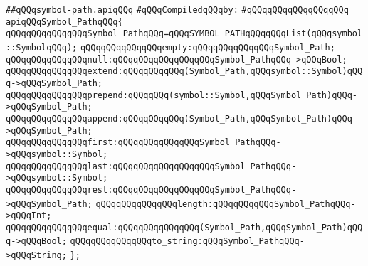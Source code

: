 \label{src/lib/compiler/front/typer-stuff/basics/symbol-path.api}
\verb|##qQQqsymbol-path.apiqQQq|\newline
\newline
\verb|#qQQqCompiledqQQqby:|\newline
\verb|#qQQqqQQqqQQqqQQqqQQq|\newline
\newline
\newline
\newline
\verb|apiqQQqSymbol_PathqQQq{|\newline
\newline
\verb|qQQqqQQqqQQqqQQqSymbol_PathqQQq=qQQqSYMBOL_PATHqQQqqQQqList(qQQqsymbol::SymbolqQQq);|\newline
\newline
\verb|qQQqqQQqqQQqqQQqempty:qQQqqQQqqQQqqQQqSymbol_Path;|\newline
\verb|qQQqqQQqqQQqqQQqnull:qQQqqQQqqQQqqQQqqQQqSymbol_PathqQQq->qQQqBool;|\newline
\verb|qQQqqQQqqQQqqQQqextend:qQQqqQQqqQQq(Symbol_Path,qQQqsymbol::Symbol)qQQq->qQQqSymbol_Path;|\newline
\newline
\verb|qQQqqQQqqQQqqQQqprepend:qQQqqQQq(symbol::Symbol,qQQqSymbol_Path)qQQq->qQQqSymbol_Path;|\newline
\verb|qQQqqQQqqQQqqQQqappend:qQQqqQQqqQQq(Symbol_Path,qQQqSymbol_Path)qQQq->qQQqSymbol_Path;|\newline
\newline
\verb|qQQqqQQqqQQqqQQqfirst:qQQqqQQqqQQqqQQqSymbol_PathqQQq->qQQqsymbol::Symbol;|\newline
\verb|qQQqqQQqqQQqqQQqlast:qQQqqQQqqQQqqQQqqQQqSymbol_PathqQQq->qQQqsymbol::Symbol;|\newline
\verb|qQQqqQQqqQQqqQQqrest:qQQqqQQqqQQqqQQqqQQqSymbol_PathqQQq->qQQqSymbol_Path;|\newline
\newline
\verb|qQQqqQQqqQQqqQQqlength:qQQqqQQqqQQqSymbol_PathqQQq->qQQqInt;|\newline
\verb|qQQqqQQqqQQqqQQqequal:qQQqqQQqqQQqqQQq(Symbol_Path,qQQqSymbol_Path)qQQq->qQQqBool;|\newline
\newline
\verb|qQQqqQQqqQQqqQQqto_string:qQQqSymbol_PathqQQq->qQQqString;|\newline
\verb|};|\newline
